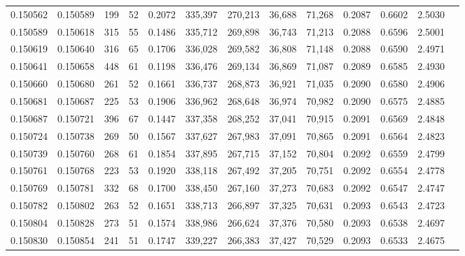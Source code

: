 \begin{tabular}{rrrrrrrrrrrrr}
0.150562 & 0.150589 &   199 &  52 &                                     0.2072 & 335,397 & 270,213 &  36,688 &  71,268 & 0.2087 & 0.6602 & 2.5030 \\
0.150589 & 0.150618 &   315 &  55 &                                     0.1486 & 335,712 & 269,898 &  36,743 &  71,213 & 0.2088 & 0.6596 & 2.5001 \\
0.150619 & 0.150640 &   316 &  65 &                                     0.1706 & 336,028 & 269,582 &  36,808 &  71,148 & 0.2088 & 0.6590 & 2.4971 \\
0.150641 & 0.150658 &   448 &  61 &                                     0.1198 & 336,476 & 269,134 &  36,869 &  71,087 & 0.2089 & 0.6585 & 2.4930 \\
0.150660 & 0.150680 &   261 &  52 &                                     0.1661 & 336,737 & 268,873 &  36,921 &  71,035 & 0.2090 & 0.6580 & 2.4906 \\
0.150681 & 0.150687 &   225 &  53 &                                     0.1906 & 336,962 & 268,648 &  36,974 &  70,982 & 0.2090 & 0.6575 & 2.4885 \\
0.150687 & 0.150721 &   396 &  67 &                                     0.1447 & 337,358 & 268,252 &  37,041 &  70,915 & 0.2091 & 0.6569 & 2.4848 \\
0.150724 & 0.150738 &   269 &  50 &                                     0.1567 & 337,627 & 267,983 &  37,091 &  70,865 & 0.2091 & 0.6564 & 2.4823 \\
0.150739 & 0.150760 &   268 &  61 &                                     0.1854 & 337,895 & 267,715 &  37,152 &  70,804 & 0.2092 & 0.6559 & 2.4799 \\
0.150761 & 0.150768 &   223 &  53 &                                     0.1920 & 338,118 & 267,492 &  37,205 &  70,751 & 0.2092 & 0.6554 & 2.4778 \\
0.150769 & 0.150781 &   332 &  68 &                                     0.1700 & 338,450 & 267,160 &  37,273 &  70,683 & 0.2092 & 0.6547 & 2.4747 \\
0.150782 & 0.150802 &   263 &  52 &                                     0.1651 & 338,713 & 266,897 &  37,325 &  70,631 & 0.2093 & 0.6543 & 2.4723 \\
0.150804 & 0.150828 &   273 &  51 &                                     0.1574 & 338,986 & 266,624 &  37,376 &  70,580 & 0.2093 & 0.6538 & 2.4697 \\
0.150830 & 0.150854 &   241 &  51 &                                     0.1747 & 339,227 & 266,383 &  37,427 &  70,529 & 0.2093 & 0.6533 & 2.4675 \\

\end{tabular}
